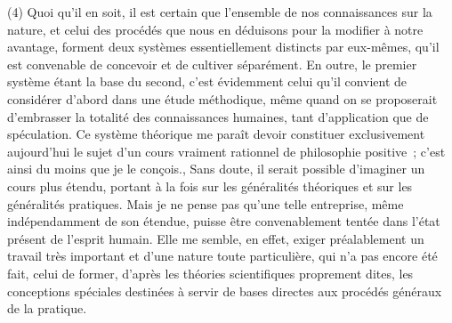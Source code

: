 \documentclass[french,twoside]{book} %
\begin{document}
(4) Quoi qu’il en soit, il est certain que l’ensemble de nos connaissances sur la nature, et celui des procédés que nous en déduisons pour la modifier à notre avantage, forment deux systèmes essentiellement distincts par eux-mêmes, qu’il est convenable de concevoir et de cultiver séparément. En outre, le premier système étant la base du second, c’est évidemment celui qu’il convient de considérer d’abord dans une étude méthodique, même quand on se proposerait d’embrasser la totalité des connaissances humaines, tant d’application que de spéculation. Ce système théorique me paraît devoir constituer exclusivement aujourd’hui le sujet d’un cours vraiment rationnel de philosophie positive ; c’est ainsi du moins que je le conçois., Sans doute, il serait possible d’imaginer un cours plus étendu, portant à la fois sur les généralités théoriques et sur les généralités pratiques. Mais je ne pense pas qu’une telle entreprise, même indépendamment de son étendue, puisse être convenablement tentée dans l’état présent de l’esprit humain. Elle me semble, en effet, exiger préalablement un travail très important et d’une nature toute particulière, qui n’a pas encore été fait, celui de former, d’après les théories scientifiques proprement dites, les conceptions spéciales destinées à servir de bases directes aux procédés généraux de la pratique.\par
\end{document}

